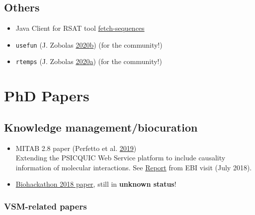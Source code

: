 \documentclass[
  12pt,
]{book}
\providecommand{\tightlist}{%
  \setlength{\itemsep}{0pt}\setlength{\parskip}{0pt}}
\begin{document}
\hypertarget{others}{%
\section*{Others}\label{others}}

\begin{itemize}
\tightlist
\item
  Java Client for RSAT tool \href{https://github.com/bblodfon/rsat-rest-java-clients}{fetch-sequences}
\item
  \texttt{usefun} (J. Zobolas \protect\hyperlink{ref-R-usefun}{2020}\protect\hyperlink{ref-R-usefun}{b}) (for the community!)
\item
  \texttt{rtemps} (J. Zobolas \protect\hyperlink{ref-R-rtemps}{2020}\protect\hyperlink{ref-R-rtemps}{a}) (for the community!)
\end{itemize}

\hypertarget{phd-papers}{%
\chapter{PhD Papers}\label{phd-papers}}

\hypertarget{knowledge-managementbiocuration}{%
\section*{Knowledge management/biocuration}\label{knowledge-managementbiocuration}}

\begin{itemize}
\tightlist
\item
  MITAB 2.8 paper (Perfetto et al. \protect\hyperlink{ref-Perfetto2019}{2019})\\
  Extending the PSICQUIC Web Service platform to include causality information of molecular interactions.
  See \href{http://tiny.cc/psicquic-mitab28}{Report} from EBI visit (July 2018).
\item
  \href{https://www.tinyurl.com/bh2018write}{Biohackathon 2018 paper}, still in \textbf{unknown status}!
\end{itemize}

\hypertarget{vsm-related-papers}{%
\subsection*{VSM-related papers}\label{vsm-related-papers}}
\end{document}
